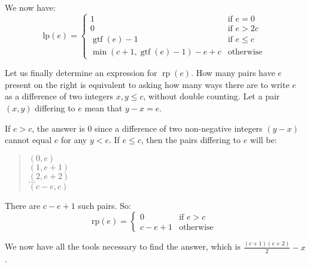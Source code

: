 \documentclass{article}
\begin{document}
We now have:
$$\mathrm{lp}(e) =
\begin{cases}
\displaystyle 1 & \text{if } e=0 \\
\displaystyle 0 & \text{if } e>2c \\
\displaystyle \operatorname{gtf}(e)-1 & \text{if } e\le c \\
\displaystyle \min(c+1, \operatorname{gtf}(e)-1)-e+c & \text{otherwise }
\end{cases}$$

Let us finally determine an expression for $\operatorname{rp}(e)$. How many pairs have $e$ present on the right is equivalent to asking how many ways there are to write $e$ as a difference of two integers $x,y \le c$, without double counting. Let a pair $(x,y)$ differing to $e$ mean that $y-x=e$.

If $e > c$, the answer is $0$ since a difference of two non-negative integers $(y-x)$ cannot equal $e$ for any $y<e$. If $e\le c$, then the pairs differing to $e$ will be:
\begin{quote}
$(0,e)$\\
$(1,e+1)$\\
$(2,e+2)$\\
$...$\\
$(c-e,c)$\\
\end{quote}

There are $c-e+1$ such pairs. So:
$$\mathrm{rp}(e) =
\begin{cases}
\displaystyle 0 & \text{if } e>c \\
\displaystyle c-e+1 & \text{otherwise }
\end{cases}$$

We now have all the tools necessary to find the answer, which is $\displaystyle \frac{(c+1)(c+2)}{2}-x$.
\end{document}
